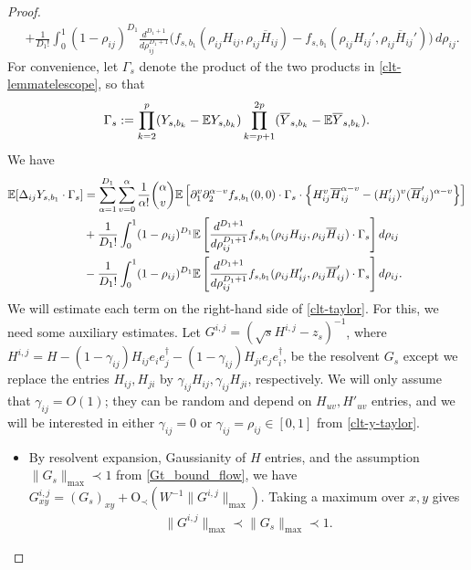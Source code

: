 \begin{proof}
\begin{align}
&+\frac{1}{D_{1}!}\int_{0}^{1}(1-\rho_{ij})^{D_{1}}\frac{d^{D_{1}+1}}{d\rho_{ij}^{D_{1}+1}}\Big(f_{s,b_{1}}(\rho_{ij}H_{ij},\rho_{ij}\overline{H}_{ij})-f_{s,b_{1}}(\rho_{ij}H_{ij}',\rho_{ij}\overline{H}_{ij}')\Big)\,d\rho_{ij}.
\end{align}
%
For convenience, let $\Gamma_{s}$ denote the product of the two products in \eqref{clt-lemmatelescope}, so that
%
\begin{align*}
\Gamma_{s}:=\prod_{k=2}^{p}(Y_{s,b_{k}}-\mathbb{E} Y_{s,b_{k}})\prod_{k=p+1}^{2p}(\overline{Y}_{s,b_{k}}-\mathbb{E} \overline{Y}_{s,b_{k}}).
\end{align*}
%
We have 
%
\begin{align}
\mathbb{E}[\Delta_{ij}Y_{s,b_{1}}\cdot\Gamma_{s}]&=\sum_{\alpha=1}^{D_{1}}\sum_{v=0}^{\alpha}\frac{1}{\alpha!}\binom{\alpha}{v}\mathbb{E}\left[\partial_{1}^{v}\partial_{2}^{\alpha-v}f_{s,b_{1}}(0,0)\cdot\Gamma_{s}\cdot\left\{H_{ij}^{v}\overline{H}_{ij}^{\alpha-v}-(H_{ij}')^{v}(\overline{H}_{ij}')^{\alpha-v}\right\}\right]\nonumber\\
&+\frac{1}{D_{1}!}\int_{0}^{1}(1-\rho_{ij})^{D_{1}}\mathbb{E}\left[\frac{d^{D_{1}+1}}{d\rho_{ij}^{D_{1}+1}}f_{s,b_{1}}(\rho_{ij}H_{ij},\rho_{ij}\overline{H}_{ij})\cdot\Gamma_{s}\right]d\rho_{ij}\nonumber\\
&-\frac{1}{D_{1}!}\int_{0}^{1}(1-\rho_{ij})^{D_{1}}\mathbb{E}\left[\frac{d^{D_{1}+1}}{d\rho_{ij}^{D_{1}+1}}f_{s,b_{1}}(\rho_{ij}H_{ij}',\rho_{ij}\overline{H}_{ij}')\cdot\Gamma_{s}\right]d\rho_{ij}.\label{clt-taylor}
\end{align}
%
We will estimate each term on the right-hand side of \eqref{clt-taylor}. For this, we need some auxiliary estimates. Let $G^{i,j}=(\sqrt{s}H^{i,j}-z_{s})^{-1}$, where $H^{i,j}=H-(1-\gamma_{ij})H_{ij}e_{i}e_{j}^{\dagger}-(1-\gamma_{ij})H_{ji}e_{j}e_{i}^{\dagger}$, be the resolvent $G_{s}$ except we replace the entries $H_{ij},H_{ji}$ by $\gamma_{ij}H_{ij},\gamma_{ij}H_{ji}$, respectively. We will only assume that $\gamma_{ij}=O(1)$; they can be random and depend on $H_{uv},H'_{uv}$ entries, and we will be interested in either $\gamma_{ij}=0$ or $\gamma_{ij}=\rho_{ij}\in[0,1]$ from \eqref{clt-y-taylor}.
\begin{itemize}
\item By resolvent expansion, Gaussianity of $H$ entries, and the assumption $\|G_{s}\|_{\max}\prec1$ from \eqref{Gt_bound_flow}, we have $G^{i,j}_{xy}=(G_{s})_{xy}+\mathrm{O}_{\prec}(W^{-1}\|G^{i,j}\|_{\max})$. Taking a maximum over $x,y$ gives 
%
\begin{align}
\|G^{i,j}\|_{\max}\prec\|G_{s}\|_{\max}\prec1.\label{clt-gij-bound}

\end{align}
\end{itemize}
\end{proof}
